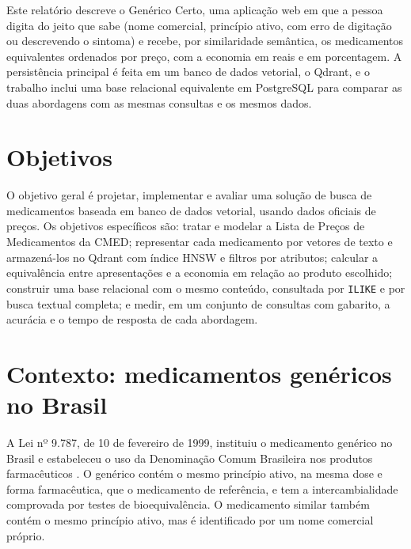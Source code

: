 \documentclass[12pt,oneside,a4paper,english,brazil]{abntex2}
\newcommand{\campo}[1]{\texttt{#1}}
\begin{document}
Este relatório descreve o Genérico Certo, uma aplicação web em que a pessoa digita do jeito que sabe (nome comercial, princípio ativo, com erro de digitação ou descrevendo o sintoma) e recebe, por similaridade semântica, os medicamentos equivalentes ordenados por preço, com a economia em reais e em porcentagem. A persistência principal é feita em um banco de dados vetorial, o Qdrant, e o trabalho inclui uma base relacional equivalente em PostgreSQL para comparar as duas abordagens com as mesmas consultas e os mesmos dados.

\section{Objetivos}

O objetivo geral é projetar, implementar e avaliar uma solução de busca de medicamentos baseada em banco de dados vetorial, usando dados oficiais de preços. Os objetivos específicos são: tratar e modelar a Lista de Preços de Medicamentos da CMED; representar cada medicamento por vetores de texto e armazená-los no Qdrant com índice HNSW e filtros por atributos; calcular a equivalência entre apresentações e a economia em relação ao produto escolhido; construir uma base relacional com o mesmo conteúdo, consultada por \campo{ILIKE} e por busca textual completa; e medir, em um conjunto de consultas com gabarito, a acurácia e o tempo de resposta de cada abordagem.

\section{Contexto: medicamentos genéricos no Brasil}

A Lei nº 9.787, de 10 de fevereiro de 1999, instituiu o medicamento genérico no Brasil e estabeleceu o uso da Denominação Comum Brasileira nos produtos farmacêuticos \cite{lei9787}. O genérico contém o mesmo princípio ativo, na mesma dose e forma farmacêutica, que o medicamento de referência, e tem a intercambialidade comprovada por testes de bioequivalência. O medicamento similar também contém o mesmo princípio ativo, mas é identificado por um nome comercial próprio.
\end{document}

